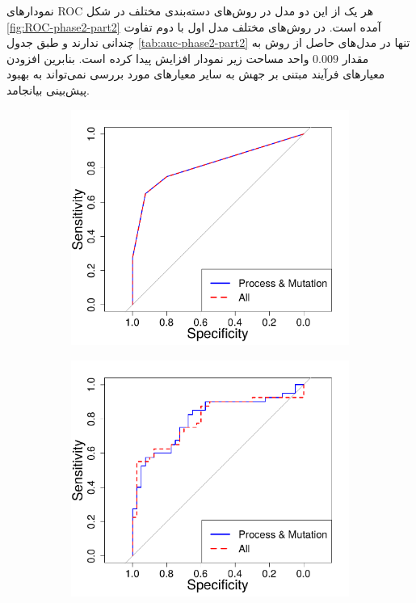 نمودارهای ROC هر یک از این دو مدل در روش‌های دسته‌بندی مختلف در شکل \ref{fig:ROC-phase2-part2} آمده است. در روش‌های مختلف مدل اول با دوم تفاوت چندانی ندارند و طبق جدول \ref{tab:auc-phase2-part2} تنها در مدل‌های حاصل از روش  به مقدار $0.009$ واحد مساحت زیر نمودار افزایش پیدا  کرده است. بنابرین افزودن  معیارهای فرآیند مبتنی بر جهش به سایر معیارهای مورد بررسی نمی‌تواند به بهبود پیش‌بینی بیانجامد.
\begin{figure}[H]
	\begin{subfigure}{.5\textwidth}
		\centering
		\includegraphics[width=\linewidth]{img/evaluation/phase2-part2-roc-dt.pdf}
		\caption{}
	\end{subfigure}
	\begin{subfigure}{.5\textwidth}
		\centering
		\includegraphics[width=\linewidth]{img/evaluation/phase2-part2-roc-svm.pdf}

\end{subfigure}
\end{figure}
